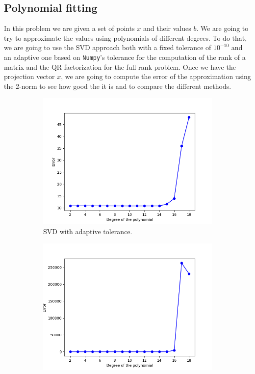 \documentclass[11pt,a4paper]{article}
\begin{document}
\subsection{Polynomial fitting}

In this problem we are given a set of points $x$ and their values $b$. We are going to try to
approximate the values using polynomials of different degrees. To do that, we are going to use
the SVD approach both with a fixed tolerance of $10^{-10}$ and an adaptive one based on \texttt{Numpy}'s
tolerance for the computation of the rank of a matrix and the QR factorization for the full rank problem.
Once we have the projection vector $x$, we are going to compute the error of the approximation using the
2-norm to see how good the it is and to compare the different methods.

\begin{figure}[H]
  \centering
  \begin{subfigure}[t]{.5\textwidth}
    \centering
    \includegraphics[scale=0.4]{img/lsp_svd_adaptive_tol}
    \caption{SVD with adaptive tolerance.}
    \label{fig:lsp-svd-adaptive-tol}
  \end{subfigure}%
  \begin{subfigure}[t]{.5\textwidth}
    \centering
    \includegraphics[scale=0.4]{img/lsp_svd_fix_tol}

\end{subfigure}
\end{figure}
\end{document}
